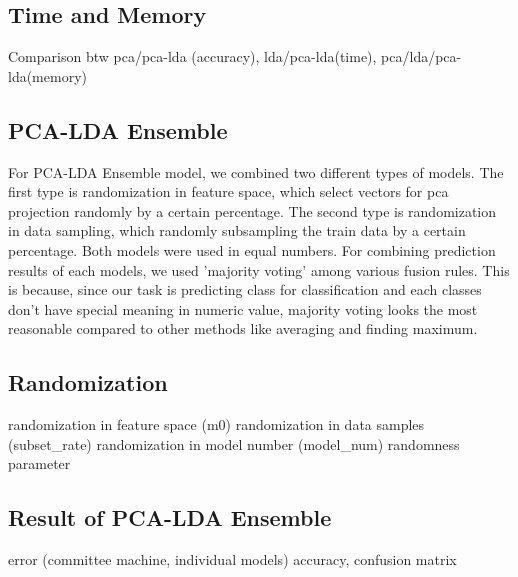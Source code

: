 \subsection{Time and Memory}
Comparison btw pca/pca-lda (accuracy), lda/pca-lda(time), pca/lda/pca-lda(memory)

\subsection{PCA-LDA Ensemble}
For PCA-LDA Ensemble model, we combined two different types of models. The first type is randomization in feature space, which select vectors for pca projection randomly by a certain percentage. The second type is randomization in data sampling, which randomly subsampling the train data by a certain percentage. Both models were used in equal numbers. For combining prediction results of each models, we used 'majority voting' among various fusion rules. This is because, since our task is predicting class for classification and each classes don't have special meaning in numeric value, majority voting looks the most reasonable compared to other methods like averaging and finding maximum. 

\subsection{Randomization}
randomization in feature space (m0)
randomization in data samples (subset\_rate)
randomization in model number (model\_num)
randomness parameter

\subsection{Result of PCA-LDA Ensemble}
error (committee machine, individual models)
accuracy, confusion matrix
